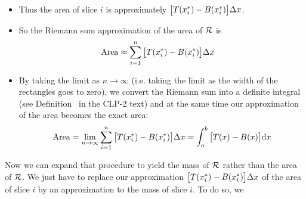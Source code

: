 \begin{itemize}
\begin{efig}
\end{efig}
\item 
Thus the area of slice $i$ is approximately $\big[T(x_i^*)-B(x_i^*)\big]\Delta x$.
\item 
So the Riemann sum approximation of the area of $\mathcal{R}$ is
\begin{align*}
  \text{Area} &\approx \sum_{i=1}^n  \big[T(x_i^*)-B(x_i^*)\big]\Delta x
\end{align*}
\item 
By taking the limit as $n \to \infty$ (i.e. taking the limit as the width of the rectangles goes to zero), we convert the Riemann sum into a definite integral (see 
Definition~ in the CLP-2 text) and at the 
same time our approximation of the area becomes the exact area:
\begin{align*}
\text{Area}
=\lim_{n\rightarrow\infty}\sum_{i=1}^n  \big[T(x_i^*)-B(x_i^*)\big]\Delta x
=\int_a^b \big[T(x)-B(x)\big]\mathrm{d}x 
\end{align*}
\end{itemize}
Now we can expand that procedure to yield the mass of $\mathcal{R}$ rather
than the area of $\mathcal{R}$. We just have to replace our approximation
$\big[T(x_i^*)-B(x_i^*)\big]\Delta x$ of the area of slice $i$ by an
approximation to the mass of slice $i$. To do so, we
